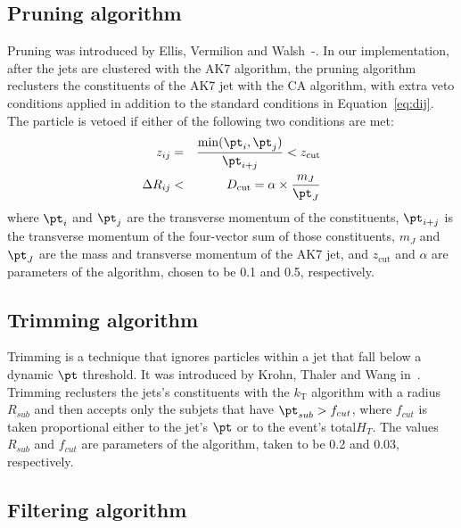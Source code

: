 \subsection{Pruning algorithm}

Pruning was introduced by Ellis, Vermilion and Walsh~\cite{pruning}-\cite{pruning2}. 
In our implementation, after
the jets are clustered with the AK7 algorithm, the pruning algorithm reclusters the constituents
of the AK7 jet with the CA algorithm, with extra
veto conditions applied in addition to the standard conditions in Equation~\ref{eq:dij}. 
The particle is vetoed if either of the following two conditions are met:
\begin{eqnarray}
z_{ij} & = & \frac{\mathrm{min}({\pt}_i,{\pt}_j)}{{\pt}_{i+j}} < z_{\mathrm{cut}} \\
\Delta R_{ij} & < & D_{\mathrm{cut}} = \alpha \times \frac{m_J}{{\pt}_J}
\end{eqnarray}
where ${\pt}_i$ and ${\pt}_j$ are the transverse momentum of the constituents,
${\pt}_{i+j}$ is the transverse momentum of the four-vector sum of those constituents,
$m_J$ and ${\pt}_J$ are the mass and transverse momentum of the AK7 jet, 
and $z_{\mathrm{cut}}$ and $\alpha$ are parameters of the algorithm, 
chosen to be 0.1 and 0.5, respectively. 

\subsection{Trimming algorithm}

Trimming is a technique that ignores particles within a jet that fall below 
a dynamic $\pt$ threshold. It was introduced by Krohn, Thaler and Wang in~\cite{trimming}. 
Trimming reclusters the jets's constituents with the $k_{\mathrm{T}}$ 
algorithm with a radius 
$R_{sub}$ and then accepts only the subjets that have 
${\pt}_{sub} > f_{cut}$, where $f_{cut}$ is taken proportional 
either to the jet's $\pt$ or to the event's total$H_T$.
The values $R_{sub}$ and $f_{cut}$ are parameters of the algorithm,
taken to be 0.2 and 0.03, respectively. 



\subsection{Filtering algorithm}

